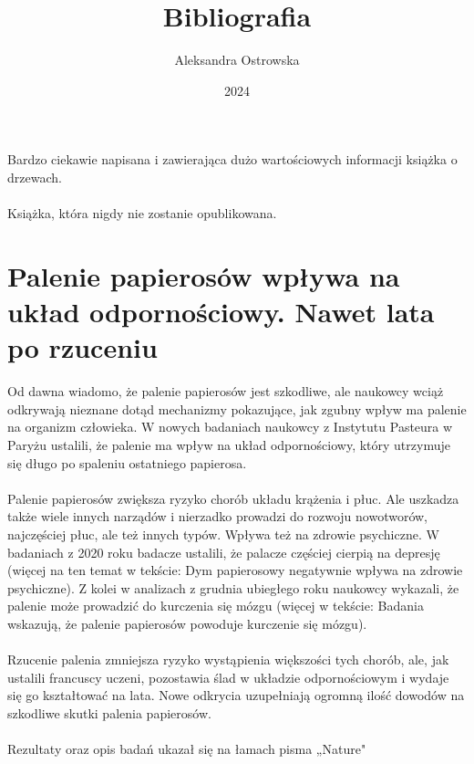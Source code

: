 \documentclass{article}
\author{Aleksandra Ostrowska}
\title{Bibliografia}
\date{2024}
\begin{document}
\maketitle
\noindent
Bardzo ciekawie napisana i zawierająca dużo wartościowych informacji książka o drzewach. \cite{Drzew} \\
\paragraph{}
Książka, która nigdy nie zostanie opublikowana. \cite{Ola} \\
\section{Palenie papierosów wpływa na układ odpornościowy. Nawet lata po rzuceniu}
Od dawna wiadomo, że palenie papierosów jest szkodliwe, ale naukowcy wciąż odkrywają nieznane dotąd mechanizmy pokazujące, jak zgubny wpływ ma palenie na organizm człowieka. W nowych badaniach naukowcy z Instytutu Pasteura w Paryżu ustalili, że palenie ma wpływ na układ odpornościowy, który utrzymuje się długo po spaleniu ostatniego papierosa.
\paragraph{}
Palenie papierosów zwiększa ryzyko chorób układu krążenia i płuc. Ale uszkadza także wiele innych narządów i nierzadko prowadzi do rozwoju nowotworów, najczęściej płuc, ale też innych typów. Wpływa też na zdrowie psychiczne. W badaniach z 2020 roku badacze ustalili, że palacze częściej cierpią na depresję (więcej na ten temat w tekście: Dym papierosowy negatywnie wpływa na zdrowie psychiczne). Z kolei w analizach z grudnia ubiegłego roku naukowcy wykazali, że palenie może prowadzić do kurczenia się mózgu (więcej w tekście: Badania wskazują, że palenie papierosów powoduje kurczenie się mózgu).
\paragraph{}
Rzucenie palenia zmniejsza ryzyko wystąpienia większości tych chorób, ale, jak ustalili francuscy uczeni, pozostawia ślad w układzie odpornościowym i wydaje się go kształtować na lata. Nowe odkrycia uzupełniają ogromną ilość dowodów na szkodliwe skutki palenia papierosów.
\paragraph{}
Rezultaty oraz opis badań ukazał się na łamach pisma „Nature" \cite{palenieJestzłe}
\end{document}
